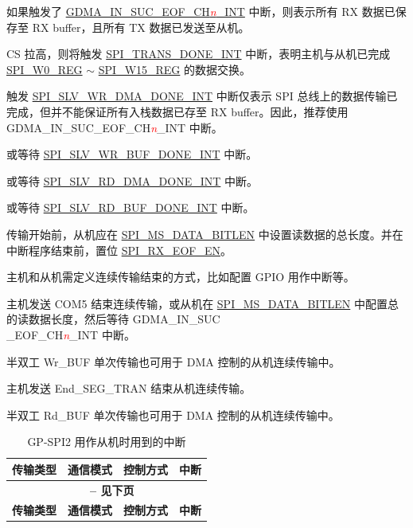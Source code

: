 \documentclass[main\_\_CN.tex]{subfiles}
\begin{document}
\begin{ThreePartTable}

\begin{TableNotes}
    \item[1] 如果触发了  \hyperref[int:GDMAINSUCEOFINT]{GDMA\_IN\_SUC\_EOF\_CH\textcolor{red}{\it{n}}\_INT}  中断，则表示所有 RX 数据已保存至 RX buffer，且所有 TX 数据已发送至从机。
    \item[2] CS 拉高，则将触发  \hyperref[int:SPITRANSDONEINT]{SPI\_TRANS\_DONE\_INT} 中断，表明主机与从机已完成  \hyperref[regdesc:SPIW0REG]{SPI\_W0\_REG} $\sim$ \hyperref[regdesc:SPIW0REG]{SPI\_W15\_REG} 的数据交换。
    \item[3] 触发  \hyperref[int:SPISLVWRDMADONEINT]{SPI\_SLV\_WR\_DMA\_DONE\_INT} 中断仅表示 SPI 总线上的数据传输已完成，但并不能保证所有入栈数据已存至 RX buffer。因此，推荐使用 GDMA\_IN\_SUC\_EOF\_CH\textcolor{red}{\it{n}}\_INT 中断。
    \item[4] 或等待 \hyperref[int:SPISLVWRBUFDONEINT]{SPI\_SLV\_WR\_BUF\_DONE\_INT} 中断。
    \item[5] 或等待 \hyperref[int:SPISLVRDDMADONEINT]{SPI\_SLV\_RD\_DMA\_DONE\_INT} 中断。
    \item[6] 或等待 \hyperref[int:SPISLVRDBUFDONEINT]{SPI\_SLV\_RD\_BUF\_DONE\_INT} 中断。
    \item[7] 传输开始前，从机应在  \hyperref[fielddesc:SPIMSDATABITLEN]{SPI\_MS\_DATA\_BITLEN} 中设置读数据的总长度。并在中断程序结束前，置位 \hyperref[fielddesc:SPIRXEOFEN]{SPI\_RX\_EOF\_EN}。
    \item[8] 主机和从机需定义连续传输结束的方式，比如配置 GPIO 用作中断等。
    \item[9] 主机发送 COM5 结束连续传输，或从机在  \hyperref[fielddesc:SPIMSDATABITLEN]{SPI\_MS\_DATA\_BITLEN} 中配置总的读数据长度，然后等待 GDMA\_IN\_SUC\\\_EOF\_CH\textcolor{red}{\it{n}}\_INT 中断。
    \item[10] 半双工 Wr\_BUF 单次传输也可用于 DMA 控制的从机连续传输中。
    \item[11] 主机发送 End\_SEG\_TRAN 结束从机连续传输。
    \item[12] 半双工 Rd\_BUF 单次传输也可用于 DMA 控制的从机连续传输中。
\end{TableNotes}
\begin{longtable}[c]{|c|l|l|l|}
\caption{GP-SPI2 用作从机时用到的中断}\label{tab:spi-slave-interrupt}
\\
\hline

\rowcolor{lightgray}
\textbf{传输类型 } & \textbf{ 通信模式} & \textbf{ 控制方式} & \textbf{ 中断 } \\\hline
    \endfirsthead
    \multicolumn{4}{c}{\bfseries \tablename\ \thetable{} -- 见下页}\\\hline
    \rowcolor{lightgray}
    \textbf{传输类型 } & \textbf{ 通信模式} & \textbf{ 控制方式} & \textbf{ 中断 }\\\hline
    \endhead


\end{longtable}
\end{ThreePartTable}
\end{document}
